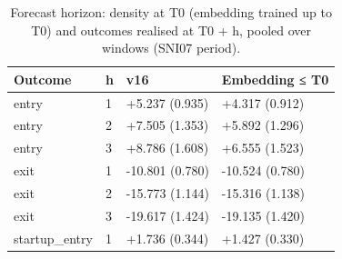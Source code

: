 \begin{table}
\caption{Forecast horizon: density at T0 (embedding trained up to T0) and outcomes realised at T0 + h, pooled over windows (SNI07 period).}
\label{tab:holdout_temporal_horizon}
\begin{tabular}{llll}
\toprule
Outcome & h & v16 & Embedding ≤ T0 \\
\midrule
entry & 1 & +5.237 (0.935) & +4.317 (0.912) \\
entry & 2 & +7.505 (1.353) & +5.892 (1.296) \\
entry & 3 & +8.786 (1.608) & +6.555 (1.523) \\
exit & 1 & -10.801 (0.780) & -10.524 (0.780) \\
exit & 2 & -15.773 (1.144) & -15.316 (1.138) \\
exit & 3 & -19.617 (1.424) & -19.135 (1.420) \\
startup\_entry & 1 & +1.736 (0.344) & +1.427 (0.330) \\
\bottomrule
\end{tabular}
\end{table}

